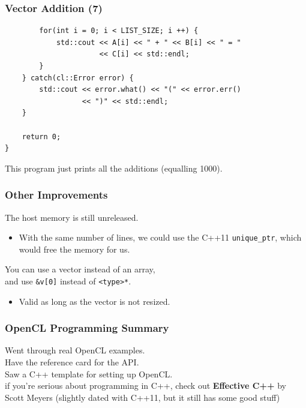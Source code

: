 \begin{frame}[fragile]
  \frametitle{Vector Addition (7)}


  \begin{lstlisting}
        for(int i = 0; i < LIST_SIZE; i ++) {
            std::cout << A[i] << " + " << B[i] << " = "
                      << C[i] << std::endl;
        }
    } catch(cl::Error error) {
        std::cout << error.what() << "(" << error.err()
                  << ")" << std::endl;
    }
 
    return 0;
}
  \end{lstlisting}

    This program just prints all the additions (equalling 1000).


\end{frame}

\begin{frame}
  \frametitle{Other Improvements}


    The host memory is still unreleased.
      \begin{itemize}
        \item With the same number of lines, we could use the C++11
          {\tt unique\_ptr}, which would free the memory for us.
      \end{itemize}
    You can use a vector instead of an array, \\ and use {\tt \&v[0]} instead
      of {\tt <type>*}.
      \begin{itemize}
        \item Valid as long as the vector is not resized.
      \end{itemize}

\end{frame}

\begin{frame}
  \frametitle{OpenCL Programming Summary}


    Went through real OpenCL examples.\\

    Have the reference card for the API.\\[1em]

    Saw a C++ template for setting up OpenCL.\\[1em]

     if you're serious about programming in C++, check
      out {\bf Effective C++} by Scott Meyers (slightly dated with C++11, but
      it still has some good stuff)

\end{frame}


